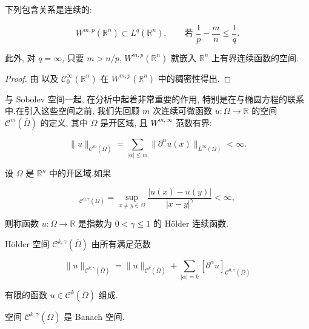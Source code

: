 \begin{proposition}\label{prop:c6-2.14}
下列包含关系是连续的:

\[
W^{m, p}(\mathbb{R}^n)\subset L^q(\mathbb{R}^n), \qquad \text{若 } \frac{1}{p} - \frac{m}{n}\le\frac{1}{q}.
\]

此外, 对 $q=\infty$, 只要 $m > n/p$, $W^{m, p}(\mathbb{R}^n)$ 就嵌入 $\mathbb{R}^n$ 上有界连续函数的空间.
\end{proposition}

\begin{proof}
由 以及 $\mathcal{C}_0^\infty(\mathbb{R}^n)$ 在 $W^{m, p}(\mathbb{R}^n)$ 中的稠密性得出.
\end{proof}


与 Sobolev 空间一起, 在分析中起着非常重要的作用, 特别是在与椭圆方程的联系中.在引入这些空间之前, 我们先回顾 $m$ 次连续可微函数 $u:\Omega\to\mathbb{R}$ 的空间 $\mathcal{C}^m(\overline{\Omega})$ 的定义, 其中 $\Omega$ 是开区域, 且 $W^{m, \infty}$ 范数有界:

\[
\|u\|_{\mathcal{C}^m(\overline{\Omega})} = \sum_{|\alpha|\le m}\|\partial^\alpha u(x)\|_{L^\infty(\Omega)} < \infty.
\]

\begin{definition}\label{def:c6-2.16}
设 $\Omega$ 是 $\mathbb{R}^n$ 中的开区域.如果

\begin{equation}
[u]_{\mathcal{C}^{0, \gamma}(\overline{\Omega})} = \sup_{x\neq y\in\Omega}\frac{|u(x)-u(y)|}{|x-y|^\gamma} < \infty, \label{eq:c6-205}
\end{equation}

则称函数 $u:\Omega\to\mathbb{R}$ 是指数为 $0<\gamma\le 1$ 的 Hölder 连续函数.
\end{definition}

Hölder 空间 $\mathcal{C}^{k, \gamma}(\overline{\Omega})$ 由所有满足范数

\begin{equation}
\|u\|_{\mathcal{C}^{k, \gamma}(\overline{\Omega})} = \|u\|_{\mathcal{C}^k(\overline{\Omega})} + \sum_{|\alpha|=k}[\partial^\alpha u]_{\mathcal{C}^{0, \gamma}(\overline{\Omega})}\label{eq:c6-206}
\end{equation}

有限的函数 $u\in\mathcal{C}^k(\overline{\Omega})$ 组成.


空间 $\mathcal{C}^{k, \gamma}(\overline{\Omega})$ 是 Banach 空间.

